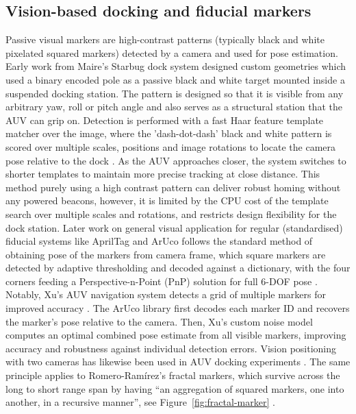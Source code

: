 \subsection{Vision-based docking and fiducial markers}

Passive visual markers are high-contrast patterns (typically black and white pixelated squared markers) detected by a camera and used for pose estimation. Early work from Maire's Starbug dock system designed custom geometries which used a binary encoded pole as a passive black and white target mounted inside a suspended docking station. The pattern is designed so that it is visible from any arbitrary yaw, roll or pitch angle and also serves as a structural station that the AUV can grip on. Detection is performed with a fast Haar feature template matcher over the image, where the 'dash-dot-dash' black and white pattern is scored over multiple scales, positions and image rotations to locate the camera pose relative to the dock \cite{maire2009vision}. As the AUV approaches closer, the system switches to shorter templates to maintain more precise tracking at close distance. This method purely using a high contrast pattern can deliver robust homing without any powered beacons, however, it is limited by the CPU cost of the template search over multiple scales and rotations, and restricts design flexibility for the dock station. Later work on general visual application for regular (standardised) fiducial systems like AprilTag and ArUco follows the standard method of obtaining pose of the markers from camera frame, which square markers are detected by adaptive thresholding and decoded against a dictionary, with the four corners feeding a Perspective-n-Point (PnP) solution for full 6-DOF pose \cite{garrido2014automatic, kalaitzakis2021fiducial}. Notably, Xu's AUV navigation system detects a grid of multiple markers for improved accuracy \cite{xu2021underwater}. The ArUco library first decodes each marker ID and recovers the marker's pose relative to the camera. Then, Xu's custom noise model computes an optimal combined pose estimate from all visible markers, improving accuracy and robustness against individual detection errors. Vision positioning with two cameras has likewise been used in AUV docking experiments \cite{li2015auv}. The same principle applies to Romero-Ram\'irez's fractal markers, which survive across the long to short range span by having ``an aggregation of squared markers, one into another, in a recursive manner'', see Figure~\ref{fig:fractal-marker} \cite{romeroramirez2019fractal}.

